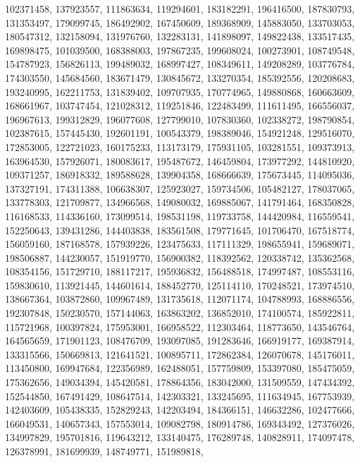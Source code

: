 {{    102371458, 137923557, 111863634, 119294601, 183182291, 196416500,
    187830793, 131353497, 179099745, 186492902, 167450609, 189368909,
    145883050, 133703053, 180547312, 132158094, 131976760, 132283131,
    141898097, 149822438, 133517435, 169898475, 101039500, 168388003,
    197867235, 199608024, 100273901, 108749548, 154787923, 156826113,
    199489032, 168997427, 108349611, 149208289, 103776784, 174303550,
    145684560, 183671479, 130845672, 133270354, 185392556, 120208683,
    193240995, 162211753, 131839402, 109707935, 170774965, 149880868,
    160663609, 168661967, 103747454, 121028312, 119251846, 122483499,
    111611495, 166556037, 196967613, 199312829, 196077608, 127799010,
    107830360, 102338272, 198790854, 102387615, 157445430, 192601191,
    100543379, 198389046, 154921248, 129516070, 172853005, 122721023,
    160175233, 113173179, 175931105, 103281551, 109373913, 163964530,
    157926071, 180083617, 195487672, 146459804, 173977292, 144810920,
    109371257, 186918332, 189588628, 139904358, 168666639, 175673445,
    114095036, 137327191, 174311388, 106638307, 125923027, 159734506,
    105482127, 178037065, 133778303, 121709877, 134966568, 149080032,
    169885067, 141791464, 168350828, 116168533, 114336160, 173099514,
    198531198, 119733758, 144420984, 116559541, 152250643, 139431286,
    144403838, 183561508, 179771645, 101706470, 167518774, 156059160,
    187168578, 157939226, 123475633, 117111329, 198655941, 159689071,
    198506887, 144230057, 151919770, 156900382, 118392562, 120338742,
    135362568, 108354156, 151729710, 188117217, 195936832, 156488518,
    174997487, 108553116, 159830610, 113921445, 144601614, 188452770,
    125114110, 170248521, 173974510, 138667364, 103872860, 109967489,
    131735618, 112071174, 104788993, 168886556, 192307848, 150230570,
    157144063, 163863202, 136852010, 174100574, 185922811, 115721968,
    100397824, 175953001, 166958522, 112303464, 118773650, 143546764,
    164565659, 171901123, 108476709, 193097085, 191283646, 166919177,
    169387914, 133315566, 150669813, 121641521, 100895711, 172862384,
    126070678, 145176011, 113450800, 169947684, 122356989, 162488051,
    157759809, 153397080, 185475059, 175362656, 149034394, 145420581,
    178864356, 183042000, 131509559, 147434392, 152544850, 167491429,
    108647514, 142303321, 133245695, 111634945, 167753939, 142403609,
    105438335, 152829243, 142203494, 184366151, 146632286, 102477666,
    166049531, 140657343, 157553014, 109082798, 180914786, 169343492,
    127376026, 134997829, 195701816, 119643212, 133140475, 176289748,
    140828911, 174097478, 126378991, 181699939, 148749771, 151989818,
}}
